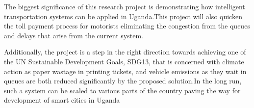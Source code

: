 The biggest significance of this research project is demonstrating how intelligent transportation systems can be applied in Uganda.This project will also quicken the toll payment process for motorists eliminating the congestion from the queues and delays that arise from the current system.

Additionally,  the project is a step in the right direction towards achieving one of the UN Sustainable Development Goals, SDG13, that is concerned with climate action\cite{united_nations_goal_2022} as paper wastage in printing tickets, and vehicle emissions as they wait in queues are both reduced significantly by the proposed solution.In the long run, such a system can be scaled to various parts of the country paving the way for development of smart cities in Uganda